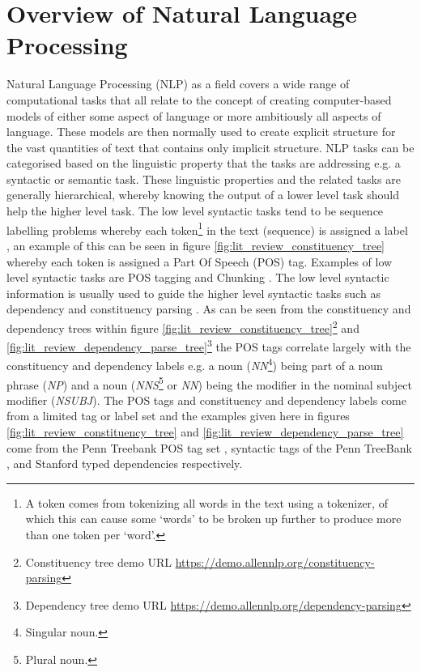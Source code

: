 \section{Overview of Natural Language Processing}
Natural Language Processing (NLP) as a field covers a wide range of computational tasks that all relate to the concept of creating computer-based models of either some aspect of language or more ambitiously all aspects of language. These models are then normally used to create explicit structure for the vast quantities of text that contains only implicit structure. NLP tasks can be categorised based on the linguistic property that the tasks are addressing e.g. a syntactic or semantic task. These linguistic properties and  the related tasks are generally hierarchical, whereby knowing the output of a lower level task should help the higher level task. The low level syntactic tasks tend to be sequence labelling problems whereby each token\footnote{A token comes from tokenizing all words in the text using a tokenizer, of which this can cause some `words' to be broken up further to produce more than one token per `word'.} \citep{kaplan2005method,dridan-oepen-2012-tokenization} in the text (sequence) is assigned a label \citep{yannakoudakis-etal-2017-neural}, an example of this can be seen in figure \ref{fig:lit_review_constituency_tree} whereby each token is assigned a Part Of Speech (POS) tag. Examples of low level syntactic tasks are POS tagging \citep{church-1988-stochastic, ling-etal-2015-finding} and Chunking \citep{tjong-kim-sang-buchholz-2000-introduction}. The low level syntactic information is usually used to guide the higher level syntactic tasks such as dependency \citep{nivre-etal-2007-conll} and constituency parsing \citep{collins-2003-head}. As can be seen from the constituency and dependency trees within figure \ref{fig:lit_review_constituency_tree}\footnote{Constituency tree demo URL \url{https://demo.allennlp.org/constituency-parsing}} and \ref{fig:lit_review_dependency_parse_tree}\footnote{Dependency tree demo URL \url{https://demo.allennlp.org/dependency-parsing}} the POS tags correlate largely with the constituency and dependency labels e.g. a noun (\textit{NN}\footnote{Singular noun.}) being part of a noun phrase (\textit{NP}) and a noun (\textit{NNS}\footnote{Plural noun.} or \textit{NN}) being the modifier in the nominal subject modifier (\textit{NSUBJ}). The POS tags and constituency and dependency labels come from a limited tag or label set and the examples given here in figures \ref{fig:lit_review_constituency_tree} and \ref{fig:lit_review_dependency_parse_tree} come from the Penn Treebank POS tag set \citep{taylor2003penn}, syntactic tags of the Penn TreeBank \citep{taylor2003penn}, and Stanford typed dependencies \citep{de2008stanford} respectively.

